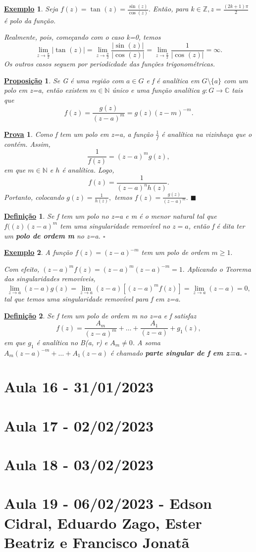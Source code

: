 \documentclass{article}
\newtheorem*{def*}{\underline{Defini\c c\~ao}}
\newtheorem{example}{\underline{Exemplo}}[section]
\newtheorem*{proof*}{\underline{Prova}}
\newtheorem*{prop*}{\underline{Proposi\c c\~ao}}
\renewcommand\qedsymbol{$\blacksquare$}
\begin{document}
  \begin{example}
    Seja \(f(z) = \tan^{}{(z)} = \frac{\sin^{}{(z)}}{\cos^{}{(z)}}.\) Então, para \(k\in \mathbb{Z}, z = \frac{(2k+1)\pi }{2}\) é polo da função.

  Realmente, pois, começando com o caso k=0, temos 
  \[
    \lim_{z\to \frac{\pi }{2}}|\tan^{}{(z)}| = \lim_{z\to \frac{\pi }{2}}\frac{|\sin^{}{(z)}|}{|\cos^{}{(z)}|} = \lim_{z\to \frac{\pi }{2}} \frac{1}{|\cos^{}{(z)}|} = \infty.
  \] 
  Os outros casos seguem por periodicdade das funções trigonométricas.
  \end{example}
  \begin{prop*}
    Se G é uma região com \(a\in G\) e f é analítica em \(G\setminus{\{a\}}\) com um polo em z=a, então existem \(m\in \mathbb{N}\) único e uma função
analítica \(g:G\rightarrow \mathbb{C}\) tais que 
  \[
    f(z) = \frac{g(z)}{(z-a)^{m}} = g(z)(z-m)^{-m}.
  \]
  \end{prop*}
 \begin{proof*}
  Como f tem um polo em z=a, a função \(\frac{1}{f}\) é analítica na vizinhaça que o contém. Assim, 
    \[
      \frac{1}{f(z)} = (z-a)^{m}g(z),
    \]
  em que \(m\in \mathbb{N}\) e \(h\) é analítica. Logo,
    \[
      f(z) = \frac{1}{(z-a)^{n}h(z)}.
    \]
  Portanto, colocando \(g(z) = \frac{1}{h(z)},\) temos \(f(z) = \frac{g(z)}{(z-a)^{m}}.\) \qedsymbol
 \end{proof*}
 \begin{def*}
  Se f tem um polo no z=a e m é o menor natural tal que \(f((z)(z-a)^{m}\) tem uma singularidade removível no \(z=a\), então f é dita ter
um \textbf{polo de ordem m} no z=a. \(\square\)
 \end{def*}
 \begin{example}
  A função \(f(z) = (z-a)^{-m}\) tem um polo de ordem \(m\geq 1.\)

  Com efeito, \((z-a)^{m}f(z) = (z-a)^{m}(z-a)^{-m} = 1.\) Aplicando o Teorema das singularidades removíveis,
  \[
    \lim_{z\to a}(z-a)g(z)=\lim_{z\to a}(z-a)[(z-a)^{m}f(z)] = \lim_{z\to a}(z-a)=0,
  \]
  tal que temos uma singularidade removível para f em z=a. 
 \end{example}
 \begin{def*}
  Se f tem um polo de ordem m no z=a e f satisfaz 
    \[
      f(z) = \frac{A_{m}}{(z-a)^{m}}+\dotsc +\frac{A_{1}}{(z-a)} + g_{1}(z),
    \]
  em que \(g_{1}\) é analítica no B(a, r) e \(A_{m}\neq0\). A soma \(A_{m}(z-a)^{-m}+\dotsc +A_{1}(z-a)\) é chamado
\textbf{parte singular de f em z=a.} \(\square\)
\end{def*}
  \newpage

  \section{Aula 16 - 31/01/2023}
  \newpage

  \section{Aula 17 - 02/02/2023}
  \newpage

  \section{Aula 18 - 03/02/2023}
  \newpage

  \section{Aula 19 - 06/02/2023 - Edson Cidral, Eduardo Zago, Ester Beatriz e Francisco Jonatã}
\end{document}

